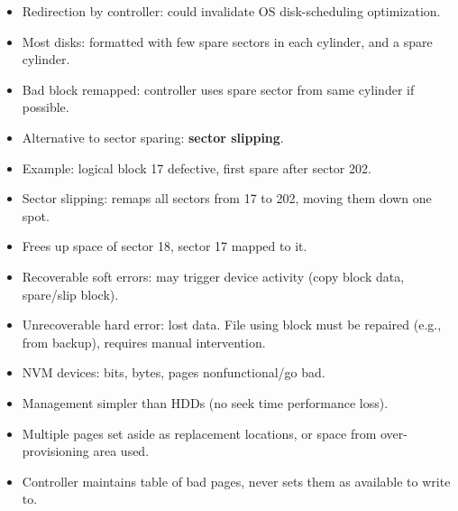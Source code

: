 \begin{itemize}
    \item Redirection by controller: could invalidate OS disk-scheduling optimization.
    \item Most disks: formatted with few spare sectors in each cylinder, and a spare cylinder.
    \item Bad block remapped: controller uses spare sector from same cylinder if possible.
    \item Alternative to sector sparing: \textbf{sector slipping}.
    \item Example: logical block 17 defective, first spare after sector 202.
    \item Sector slipping: remaps all sectors from 17 to 202, moving them down one spot.
    \item Frees up space of sector 18, sector 17 mapped to it.
    \item Recoverable soft errors: may trigger device activity (copy block data, spare/slip block).
    \item Unrecoverable hard error: lost data. File using block must be repaired (e.g., from backup), requires manual intervention.
    \item NVM devices: bits, bytes, pages nonfunctional/go bad.
    \item Management simpler than HDDs (no seek time performance loss).
    \item Multiple pages set aside as replacement locations, or space from over-provisioning area used.
    \item Controller maintains table of bad pages, never sets them as available to write to.
\end{itemize}


